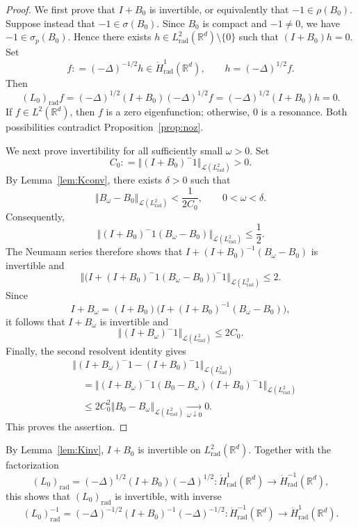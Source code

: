 \documentclass[12pt, a4paper, reqno]{amsart}
\numberwithin{equation}{section}
\theoremstyle{definition}
\theoremstyle{remark}
\newcommand{\R}{\mathbb R}
\def\norm[#1]{{\left\Vert #1 \right\Vert}}
\newcommand{\rad}{\mathrm{rad}}
\newcommand{\ce}{\mathrel{\mathop:}=}
\begin{document}
\begin{proof}
We first prove that $I+B_0$ is invertible, or equivalently that
$-1\in\rho(B_0)$. Suppose instead that $-1\in\sigma(B_0)$. Since $B_0$ is
compact and $-1\ne0$, we have $-1\in\sigma_p(B_0)$. Hence there exists
$h\in L^2_{\rad}(\R^d)\setminus\{0\}$ such that $(I+B_0)h=0$. Set
\[
  f\ce(-\Delta)^{-1/2}h\in\dot H^1_{\rad}(\R^d),
  \qquad
  h=(-\Delta)^{1/2}f.
\]
Then
\[
  (L_0)_{\rad}f
  =(-\Delta)^{1/2}(I+B_0)(-\Delta)^{1/2}f
  =(-\Delta)^{1/2}(I+B_0)h
  =0.
\]
If $f\in L^2(\R^d)$, then $f$ is a zero eigenfunction;
otherwise, $0$ is a resonance.
Both possibilities contradict Proposition~\ref{prop:noz}.

We next prove invertibility for all sufficiently small $\omega>0$. Set
\[
  C_0\ce\norm[(I+B_0)^{-1}]_{\mathcal{L}(L^2_{\rad})}>0.
\]
By Lemma~\ref{lem:Kconv}, there exists $\delta>0$ such that
\[
  \norm[B_\omega-B_0]_{\mathcal{L}(L^2_{\rad})}
  <\frac{1}{2C_0},
  \qquad 0<\omega<\delta.
\]
Consequently,
\[
  \norm[
    (I+B_0)^{-1}(B_\omega-B_0)
  ]_{\mathcal{L}(L^2_{\rad})}
  \le\frac12.
\]
The Neumann series therefore shows that
$I+(I+B_0)^{-1}(B_\omega-B_0)$ is invertible and
\[
  \norm[
    \bigl(I+(I+B_0)^{-1}(B_\omega-B_0)\bigr)^{-1}
  ]_{\mathcal{L}(L^2_{\rad})}
  \le2.
\]
Since
\[
  I+B_\omega
  =(I+B_0)
    \bigl(I+(I+B_0)^{-1}(B_\omega-B_0)\bigr),
\]
it follows that $I+B_\omega$ is invertible and
\[
  \norm[(I+B_\omega)^{-1}]_{\mathcal{L}(L^2_{\rad})}
  \le2C_0.
\]
Finally, the second resolvent identity gives
\begin{align*}
  &\norm[
    (I+B_\omega)^{-1}-(I+B_0)^{-1}
  ]_{\mathcal{L}(L^2_{\rad})}
  \\
  &\quad=
  \norm[
    (I+B_\omega)^{-1}
    (B_0-B_\omega)
    (I+B_0)^{-1}
  ]_{\mathcal{L}(L^2_{\rad})}
  \\
  &\quad\le
  2C_0^2\norm[B_0-B_\omega]_{\mathcal{L}(L^2_{\rad})}
  \xrightarrow[\omega\downarrow0]{}0.
\end{align*}
This proves the assertion.
\end{proof}
%

By Lemma~\ref{lem:Kinv}, $I+B_0$ is invertible on
$L^2_{\rad}(\R^d)$. Together with the factorization
\[
  (L_0)_{\rad}
  =(-\Delta)^{1/2}(I+B_0)(-\Delta)^{1/2}
  \colon\dot H^1_{\rad}(\R^d)\to\dot H^{-1}_{\rad}(\R^d),
\]
this shows that $(L_0)_{\rad}$ is invertible, with inverse
\[
  (L_0)_{\rad}^{-1}
  =(-\Delta)^{-1/2}(I+B_0)^{-1}(-\Delta)^{-1/2}
  \colon\dot H^{-1}_{\rad}(\R^d)\to\dot H^1_{\rad}(\R^d).
\]
\end{document}
